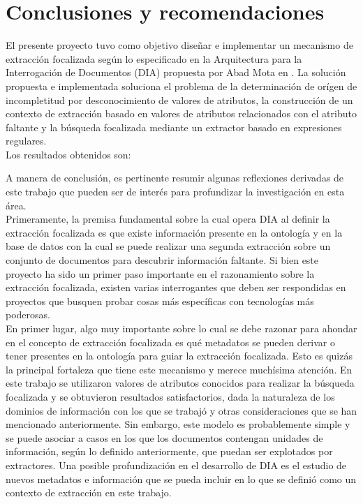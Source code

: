 \chapter*{Conclusiones y recomendaciones} \label{chap:conclusiones}

El presente proyecto tuvo como objetivo diseñar e implementar un mecanismo de extracción focalizada según lo especificado en la Arquitectura para la Interrogación de Documentos (DIA) propuesta por Abad Mota en \cite{documentInterrogationArchitecture}. La solución propuesta e implementada soluciona el problema de la determinación de orígen de incompletitud por desconocimiento de valores de atributos, la construcción de un contexto de extracción basado en valores de atributos relacionados con el atributo faltante y la búsqueda focalizada mediante un extractor basado en expresiones regulares. \\

Los resultados obtenidos son: 

A manera de conclusión, es pertinente resumir algunas reflexiones derivadas de este trabajo que pueden ser de interés para profundizar la investigación en esta área. \\

Primeramente, la premisa fundamental sobre la cual opera DIA al definir la extracción focalizada es que existe información presente en la ontología y en la base de datos con la cual se puede realizar una segunda extracción sobre un conjunto de documentos para descubrir información faltante. Si bien este proyecto ha sido un primer paso importante en el razonamiento sobre la extracción focalizada, existen varias interrogantes que deben ser respondidas en proyectos que busquen probar cosas más específicas con tecnologías más poderosas. \\

En primer lugar, algo muy importante sobre lo cual se debe razonar para ahondar en el concepto de extracción focalizada es qué metadatos se pueden derivar o tener presentes en la ontología para guiar la extracción focalizada. Esto es quizás la principal fortaleza que tiene este mecanismo y merece muchísima atención. En este trabajo se utilizaron valores de atributos conocidos para realizar la búsqueda focalizada y se obtuvieron resultados satisfactorios, dada la naturaleza de los dominios de información con los que se trabajó y otras consideraciones que se han mencionado anteriormente. Sin embargo, este modelo es probablemente simple y se puede asociar a casos en los que los documentos contengan unidades de información, según lo definido anteriormente, que puedan ser explotados por extractores. Una posible profundización en el desarrollo de DIA es el estudio de nuevos metadatos e información que se pueda incluir en lo que se definió como un contexto de extracción en este trabajo. \\

